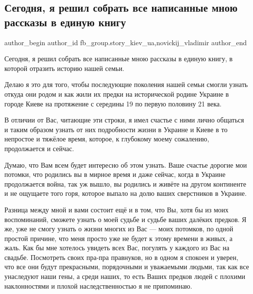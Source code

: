  
 
 
 
 

\subsection{Сегодня, я решил собрать все написанные мною рассказы  в единую книгу}
\label{sec:26_02_2023.fb.fb_group.story_kiev_ua.1.segodnya__ya_reshil_}
 
\ifcmt
 author_begin
   author_id fb_group.story_kiev_ua,novickij_vladimir
 author_end
\fi

Сегодня, я решил собрать все написанные мною рассказы  в единую книгу, в
которой отразить историю нашей семьи.

Делаю я это для того, чтобы последующие поколения нашей семьи смогли узнать
откуда они родом и как жили их предки на  исторической родине  Украине  в
городе Киеве на протяжение с середины 19 по первую половину 21 века.

В отличии от Вас, читающие эти строки, я  имел счастье с ними лично общаться и
таким образом узнать от них подробности жизни в Украине  и  Киеве в то
непростое и тяжёлое  время, которое, к глубокому моему сожалению, продолжается
и сейчас.

Думаю,  что  Вам всем будет  интересно об этом  узнать. Ваше счастье дорогие
мои потомки, что  родились  вы в мирное время и даже сейчас, когда  в Украине
продолжается война, так уж вышло, вы  родились и живёте на другом континенте и
не ощущаете того горя, которое выпало на долю  ваших сверстников в Украине.

Разница между мной и вами состоит ещё и в том, что Вы, хотя бы из моих
воспоминаний, сможете  узнать о моей судьбе и  судьбе ваших  далёких предков. Я
же, уже не смогу узнать о жизни многих из Вас — моих потомков, по одной простой
причине, что меня просто уже не будет к этому времени в живых, а жаль.  Как бы
мне хотелось увидеть всех Вас, погулять у каждого из Вас на свадьбе.
Посмотреть  своих пра-пра правнуков, но в одном я спокоен и уверен, что  все
они  будут прекрасными,  порядочными  и уважаемыми людьми, так как  все
унаследуют наши гены, а среди наших, то есть  Ваших предков людей с плохими
наклонностями  и  плохой наследственностью я не припоминаю.

